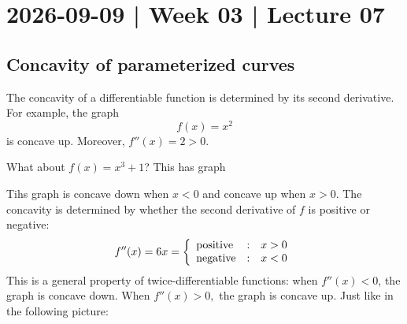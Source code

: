 \documentclass[10pt]{article}
\theoremstyle{definition}
\newcommand{\1}[1]{\textbf{1}_{\left[#1\right]}} %
\begin{document}
\newpage
\section{2026-09-09 | Week 03 | Lecture 07}

\subsection{Concavity of parameterized curves}
The concavity of a differentiable function is determined by its second derivative. For example, the graph
\begin{equation*}
  f(x) = x^{2}
\end{equation*}
is concave up. Moreover, $f''(x) = 2>0$.

What about $f(x) = x^{3}+1$? This has graph

\begin{center}
\end{center}
Tihs graph is concave down when $x<0$ and concave up when $x>0$. The concavity is determined by whether the second
derivative of $f$ is positive or negative:
\begin{equation*}
  f''(x) = 6x = \left\{ \begin{array}{l@{\quad:\quad}l} \text{positive} &x>0 \\ \text{negative}&x<0 \end{array}\right.
\end{equation*}
This is a general property of twice-differentiable functions: when $f''(x)<0$, the graph is concave down. When
$f''(x)>0,$ the graph is concave up. Just like in the following picture:

\begin{center}
\end{center}
\end{document}

